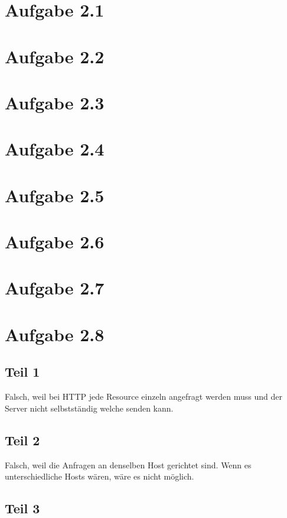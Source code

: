 \documentclass[10pt,a4paper]{article}
\begin{document}
\section{Aufgabe 2.1}

\section{Aufgabe 2.2}

\section{Aufgabe 2.3}

\section{Aufgabe 2.4}

\section{Aufgabe 2.5}

\section{Aufgabe 2.6}

\section{Aufgabe 2.7}

\section{Aufgabe 2.8}

\subsection{Teil 1}

Falsch, weil bei HTTP jede Resource einzeln angefragt werden muss und der Server
nicht selbstständig welche senden kann.

\subsection{Teil 2}

Falsch, weil die Anfragen an denselben Host gerichtet sind. Wenn es
unterschiedliche Hosts wären, wäre es nicht möglich.

\subsection{Teil 3}
\end{document}
